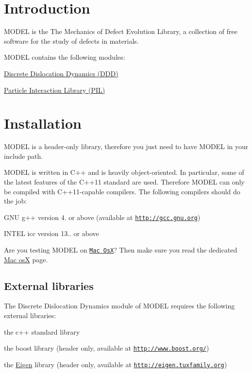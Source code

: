 \hypertarget{index_introduction}{}\section{Introduction}\label{index_introduction}
M\+O\+D\+E\+L is the The Mechanics of Defect Evolution Library, a collection of free software for the study of defects in materials.

M\+O\+D\+E\+L contains the following modules\+:
\begin{DoxyItemize}
\item \hyperlink{_d_d_intro}{Discrete Dislocation Dynamics (D\+D\+D)}
\item \hyperlink{_p_i_l}{Particle Interaction Library (P\+I\+L)}
\end{DoxyItemize}\hypertarget{index_installation}{}\section{Installation}\label{index_installation}
M\+O\+D\+E\+L is a header-\/only library, therefore you just need to have M\+O\+D\+E\+L in your include path.

M\+O\+D\+E\+L is written in C++ and is heavily object-\/oriented. In particular, some of the latest features of the C++11 standard are used. Therefore M\+O\+D\+E\+L can only be compiled with C++11-\/capable compilers. The following compilers should do the job\+:
\begin{DoxyItemize}
\item G\+N\+U g++ version 4. or above (available at \href{http://gcc.gnu.org}{\tt http\+://gcc.\+gnu.\+org})
\item I\+N\+T\+E\+L icc version 13.. or above
\end{DoxyItemize}

Are you testing M\+O\+D\+E\+L on \href{http://www.apple.com/osx/}{\tt Mac Os\+X}? Then make sure you read the dedicated \hyperlink{macosx}{Mac os\+X} page.\hypertarget{index_libraries}{}\subsection{External libraries}\label{index_libraries}
The Discrete Dislocation Dynamics module of M\+O\+D\+E\+L requires the following external libraries\+:
\begin{DoxyItemize}
\item the c++ standard library
\item the boost library (header only, available at \href{http://www.boost.org/}{\tt http\+://www.\+boost.\+org/})
\item the \hyperlink{namespace_eigen}{Eigen} library (header only, available at \href{http://eigen.tuxfamily.org}{\tt http\+://eigen.\+tuxfamily.\+org})
\end{DoxyItemize}

